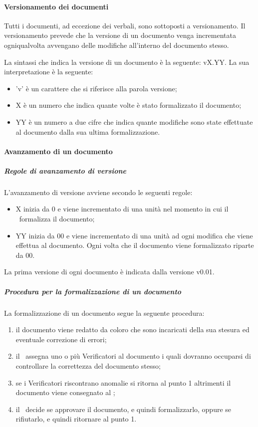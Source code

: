 \documentclass[../NormeProgetto.tex]{subfiles}
\begin{document}
	\paragraph{Versionamento dei documenti} \label{sec:Versionamento dei documenti}
	Tutti i documenti, ad eccezione dei verbali, sono sottoposti a versionamento. Il versionamento prevede che la versione di un documento venga incrementata ogniqualvolta avvengano delle modifiche all'interno del documento stesso.
	
	La sintassi che indica la versione di un documento è la seguente: vX.YY. La sua interpretazione è la seguente:
	\begin{itemize}
		\item 'v' è un carattere che si riferisce alla parola versione;
		\item X è un numero che indica quante volte è stato formalizzato il documento;
		\item YY è un numero a due cifre che indica quante modifiche sono state effettuate al documento dalla sua ultima formalizzazione.
	\end{itemize}
	\paragraph{Avanzamento di un documento} 
		\subparagraph{Regole di avanzamento di versione}
		L'avanzamento di versione avviene secondo le seguenti regole:
		\begin{itemize}
			\item X inizia da 0 e viene incrementato di una unità nel momento in cui il \responsabilediprogetto\ formalizza il documento;
			\item YY inizia da 00 e viene incrementato di una unità ad ogni modifica che viene effettua al documento. Ogni volta che il documento viene formalizzato riparte da 00.
		\end{itemize}
		La prima versione di ogni documento è indicata dalla versione v0.01.		
		
		\subparagraph{Procedura per la formalizzazione di un documento}
		La formalizzazione di un documento segue la seguente procedura:
		\begin{enumerate}
			\item il documento viene redatto da coloro che sono incaricati della sua stesura ed eventuale correzione di errori;
			\item il \responsabilediprogetto\ assegna uno o più Verificatori al documento i quali dovranno occuparsi di controllare la correttezza del documento stesso;
			\item se i Verificatori riscontrano anomalie si ritorna al punto 1 altrimenti il documento viene consegnato al \responsabilediprogetto;
			\item il \responsabilediprogetto\ decide se approvare il documento, e quindi formalizzarlo, oppure se rifiutarlo, e quindi ritornare al punto 1.
		\end{enumerate}
\end{document}
